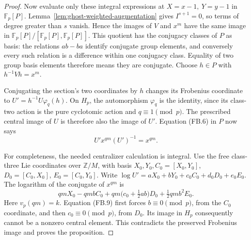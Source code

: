 \begin{proof}
Now evaluate only these integral expressions at
\(X=x-1,\ Y=y-1\) in \(\mathbb F_p[P]\).
Lemma~\ref{lem:ghost-weighted-augmentation}
gives \(I^{s+1}=0\), so terms of degree greater
than \(s\) vanish. Hence the images of \(V\)
and \(x^m\) have the same image in
\(\mathbb F_p[P]/[\mathbb F_p[P],\mathbb F_p[P]]\).
This quotient has the conjugacy classes of \(P\)
as basis: the relations \(ab-ba\) identify
conjugate group elements, and conversely every
such relation is a difference within one
conjugacy class. Equality of two group basis
elements therefore means they are conjugate.
Choose \(h\in P\) with \(h^{-1}Vh=x^m\).

Conjugating the section's two coordinates by
\(h\) changes its Frobenius coordinate to
\(U'=h^{-1}U\varphi_q(h)\).
On \(H_p\), the automorphism \(\varphi_q\)
is the identity, since its class-two action is
the pure cyclotomic action and \(q\equiv1\pmod p\).
The prescribed central image of \(U\) is
therefore also the image of \(U'\).
Equation (FB.6) in \(P\) now says
\[
 U'x^{qm}(U')^{-1}=x^{qm}.
 \tag{FB.9}
\]

For completeness, the needed centralizer
calculation is integral. Use the free
class-three Lie coordinates over \(\mathbb Z/M\),
with basis \(X_0,Y_0,C_0=[X_0,Y_0]\),
\(D_0=[C_0,X_0]\), \(E_0=[C_0,Y_0]\).
Write
\(\log U'=aX_0+bY_0+c_0C_0+d_0D_0+e_0E_0\).
The logarithm of the conjugate of \(x^{qm}\)
is
\[
 qmX_0-qmbC_0+
 qm\bigl(c_0+\tfrac12ab\bigr)D_0+
 \tfrac12qmb^2E_0.
 \tag{FB.10}
\]
Here \(v_p(qm)=k\). Equation (FB.9) first
forces \(b\equiv0\pmod p\), from the
\(C_0\) coordinate, and then
\(c_0\equiv0\pmod p\), from \(D_0\).
Its image in \(H_p\) consequently cannot
be a nonzero central element.
This contradicts the preserved Frobenius
image and proves the proposition.
\end{proof}

